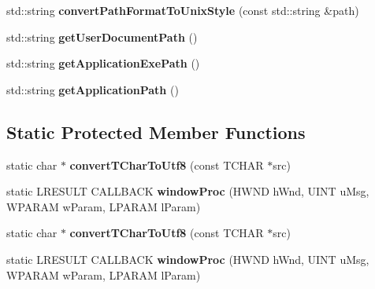 \begin{DoxyCompactItemize}
std\+::string {\bfseries convert\+Path\+Format\+To\+Unix\+Style} (const std\+::string \&path)
\item 
\mbox{\label{classSimulatorWin_a5172f474956da2f0a2bde34516ca1982}} 
std\+::string {\bfseries get\+User\+Document\+Path} ()
\item 
\mbox{\label{classSimulatorWin_a23ab0b92e0d387bbbc131f9773a275d0}} 
std\+::string {\bfseries get\+Application\+Exe\+Path} ()
\item 
\mbox{\label{classSimulatorWin_adb010374b0d4cfdd77f254de3a366b1e}} 
std\+::string {\bfseries get\+Application\+Path} ()
\end{DoxyCompactItemize}
\subsection*{Static Protected Member Functions}
\begin{DoxyCompactItemize}
\item 
\mbox{\label{classSimulatorWin_a1f04b689480af3cd60a17f6bfa51fccc}} 
static char $\ast$ {\bfseries convert\+T\+Char\+To\+Utf8} (const T\+C\+H\+AR $\ast$src)
\item 
\mbox{\label{classSimulatorWin_a22a30b72f35198406e3dc59dd190e4f8}} 
static L\+R\+E\+S\+U\+LT C\+A\+L\+L\+B\+A\+CK {\bfseries window\+Proc} (H\+W\+ND h\+Wnd, U\+I\+NT u\+Msg, W\+P\+A\+R\+AM w\+Param, L\+P\+A\+R\+AM l\+Param)
\item 
\mbox{\label{classSimulatorWin_a47df22470b7d090be40874fcb6d41495}} 
static char $\ast$ {\bfseries convert\+T\+Char\+To\+Utf8} (const T\+C\+H\+AR $\ast$src)
\item 
\mbox{\label{classSimulatorWin_abd8ea7693a6762b6953ebe88a526adad}} 
static L\+R\+E\+S\+U\+LT C\+A\+L\+L\+B\+A\+CK {\bfseries window\+Proc} (H\+W\+ND h\+Wnd, U\+I\+NT u\+Msg, W\+P\+A\+R\+AM w\+Param, L\+P\+A\+R\+AM l\+Param)
\end{DoxyCompactItemize}
